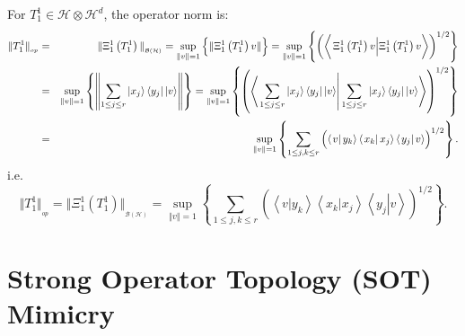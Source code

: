 \documentclass[aps,preprint]{revtex4}
\begin{document}
For $T_{1}^{1}\in \mathcal{H}\otimes \mathcal{H}^{d}$, the operator norm is: 
\begin{eqnarray*}
\Vert T_{1}^{1}\Vert _{_{op}} &=&\Vert \Xi _{1}^{1}\left( T_{1}^{1}\right)
\Vert _{_{\mathcal{B}\left( \mathcal{H}\right) }}=\sup_{\Vert v\Vert
=1}\left\{ \overset{}{\Vert \Xi _{1}^{1}\left( T_{1}^{1}\right) v\Vert }%
\right\} =\sup_{\Vert v\Vert =1}\left\{ \left( \left\langle \overset{}{%
\left. \overset{}{\Xi _{1}^{1}\left( T_{1}^{1}\right) v}\right\vert }\Xi
_{1}^{1}\left( T_{1}^{1}\right) v\right\rangle \right) ^{1/2}\right\} \\
&=&\sup_{\Vert v\Vert =1}\left\{ \left\Vert \overset{}{\sum_{1\leq j\leq
r}\left\vert x_{j}\right\rangle \left\langle y_{j}\right\vert \left\vert
v\right\rangle }\right\Vert \right\} =\sup_{\Vert v\Vert =1}\left\{ \left( 
\overset{}{\left\langle \left. \sum_{1\leq j\leq r}\left\vert
x_{j}\right\rangle \left\langle y_{j}\right\vert \left\vert v\right\rangle
\right\vert \sum_{1\leq j\leq r}\left\vert x_{j}\right\rangle \left\langle
y_{j}\right\vert \left\vert v\right\rangle \right\rangle }\right)
^{1/2}\right\} \\
&=&\sup_{\Vert v\Vert =1}\left\{ \sum_{1\leq j,k\leq r}\left( \overset{}{%
\left\langle \left. v\right\vert y_{k}\right\rangle \left\langle \left.
x_{k}\right\vert x_{j}\right\rangle \left\langle \left. y_{j}\right\vert
v\right\rangle }\right) ^{1/2}\right\} .
\end{eqnarray*}%
i.e.%
\begin{equation}
\Vert T_{1}^{1}\Vert _{_{op}}=\Vert \Xi _{1}^{1}\left( T_{1}^{1}\right)
\Vert _{_{\mathcal{B}\left( \mathcal{H}\right) }}=\sup_{\Vert v\Vert
=1}\left\{ \sum_{1\leq j,k\leq r}\left( \overset{}{\left\langle \left.
v\right\vert y_{k}\right\rangle \left\langle \left. x_{k}\right\vert
x_{j}\right\rangle \left\langle \left. y_{j}\right\vert v\right\rangle }%
\right) ^{1/2}\right\} .
\end{equation}

\section{Strong Operator Topology (SOT) Mimicry}
\end{document}

